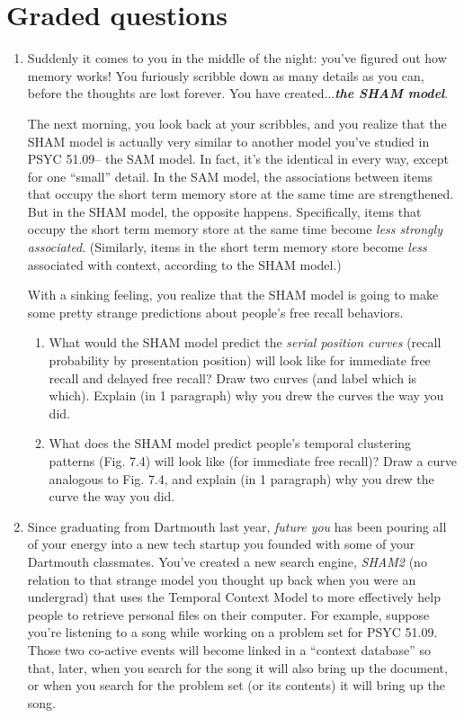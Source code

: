 \documentclass[11pt]{article}
\begin{document}
\section*{Graded questions}
\begin{enumerate}
\item Suddenly it comes to you in the middle of the night: you've figured
  out how memory works!  You furiously scribble down as many details
  as you can, before the thoughts are lost forever.  You have
  created...\textit{\textbf{the SHAM model}}.

The next morning, you look back at your scribbles, and you realize
that the SHAM model is actually very similar to another model you've studied in
PSYC 51.09-- the SAM model.  In fact, it's the identical in every way,
except for one ``small'' detail.  In the SAM model, the associations
between items that occupy the short term memory store at the same time
are strengthened.  But in the SHAM model, the opposite happens.  Specifically,
items that occupy the short term memory store at the same time become
\textit{less strongly associated}.  (Similarly, items in the short
term memory store become \textit{less} associated with context,
according to the SHAM model.)

With a sinking feeling, you realize that the SHAM model is going to
make some pretty strange predictions about people's free recall
behaviors.
\begin{enumerate}
\item What would the SHAM model predict the \textit{serial position
    curves} (recall probability by presentation position) will look like for immediate free recall and
  delayed free recall?  Draw two curves (and label which is which).
  Explain (in 1 paragraph) why you drew the curves the way you
  did.

\item What does the SHAM model predict people's temporal clustering
  patterns (Fig. 7.4) will look like (for immediate free recall)?
  Draw a curve analogous to Fig. 7.4, and explain (in 1 paragraph) why
  you drew the curve the way you did.
\end{enumerate}

\item Since graduating from Dartmouth last year, \textit{future you} has been
  pouring all of your energy into a new tech startup you founded with
  some of your Dartmouth classmates.  You've created a new search
  engine, \textit{SHAM2} (no relation to that strange model you
  thought up back when you were an undergrad) that uses the Temporal
  Context Model to more effectively help people to retrieve personal
  files on their computer.  For example, suppose you're listening to a song
  while working on a problem set for PSYC 51.09.  Those two co-active events will become
  linked in a ``context database'' so that, later, when you search for
  the song it will also bring up the document, or when you search for the
  problem set (or its contents) it will bring up the song.


\end{enumerate}
\end{document}

